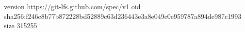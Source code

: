 version https://git-lfs.github.com/spec/v1
oid sha256:f246c8b77b872228bd52889c63d236443e3a8e049c0e959787a894de987c1993
size 315255
